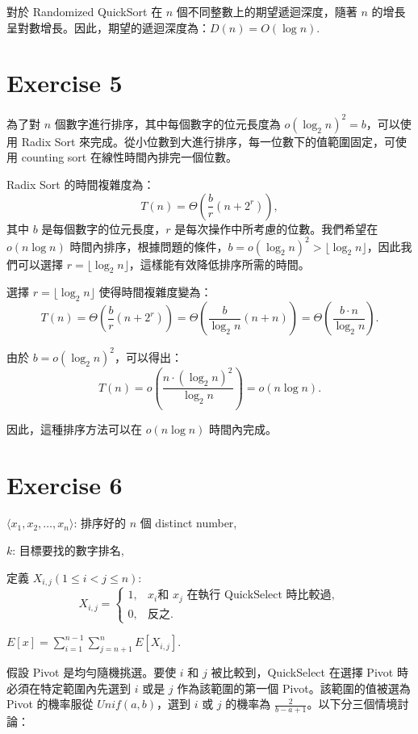 \documentclass[8pt, fleqn]{report}
\begin{document}
對於 Randomized QuickSort 在 \(n\) 個不同整數上的期望遞迴深度，隨著 \(n\) 的增長呈對數增長。因此，期望的遞迴深度為：\(D(n) = O(\log{n})\).

\section*{Exercise 5}
為了對 \(n\) 個數字進行排序，其中每個數字的位元長度為 \(o(\log_2{n})^2 = b\)，可以使用 Radix Sort 來完成。從小位數到大進行排序，每一位數下的值範圍固定，可使用 counting sort 在線性時間內排完一個位數。

Radix Sort 的時間複雜度為：
\[
    T(n) = \Theta\left(\frac{b}{r}(n + 2^r)\right),
\]
其中 \(b\) 是每個數字的位元長度，\(r\) 是每次操作中所考慮的位數。我們希望在 \(o(n \log n)\) 時間內排序，根據問題的條件，\(b = o(\log_2{n})^2 > \lfloor \log_2{n} \rfloor\)，因此我們可以選擇 \(r = \lfloor \log_2{n} \rfloor\)，這樣能有效降低排序所需的時間。

選擇 \(r = \lfloor \log_2{n} \rfloor\) 使得時間複雜度變為：
\[
    T(n) = \Theta\left(\frac{b}{r}(n + 2^r)\right) = \Theta\left(\frac{b}{\log_2{n}}(n + n)\right) = \Theta\left(\frac{b \cdot n}{\log_2{n}}\right).
\]

由於 \(b = o(\log_2{n})^2\)，可以得出：
\[
    T(n) = o\left(\frac{n \cdot (\log_2{n})^2}{\log_2{n}}\right) = o(n \log n).
\]

因此，這種排序方法可以在 \(o(n \log n)\) 時間內完成。

\section*{Exercise 6}
\(\langle x_1, x_2, \dots, x_n \rangle\): 排序好的 \(n\) 個 distinct number,

\(k\): 目標要找的數字排名,

定義 \(X_{i, j} (1 \leq i < j \leq n)\):
\begin{equation*}
    X_{i, j} = \begin{cases}
        1, & x_i \text{和 } x_j \text{ 在執行 QuickSelect 時比較過}, \\
        0, & \text{反之}.
    \end{cases}
\end{equation*}

\(E[x] = \sum_{i=1}^{n-1} \sum_{j=n+1}^{n} E[X_{i, j}]\).

假設 Pivot 是均勻隨機挑選。要使 \(i\) 和 \(j\) 被比較到，QuickSelect 在選擇 Pivot 時必須在特定範圍內先選到 \(i\) 或是 \(j\) 作為該範圍的第一個 Pivot。該範圍的值被選為 Pivot 的機率服從 \(Unif(a, b)\)，選到 \(i\) 或 \(j\) 的機率為 \(\frac{2}{b-a+1}\)。以下分三個情境討論：
\end{document}
